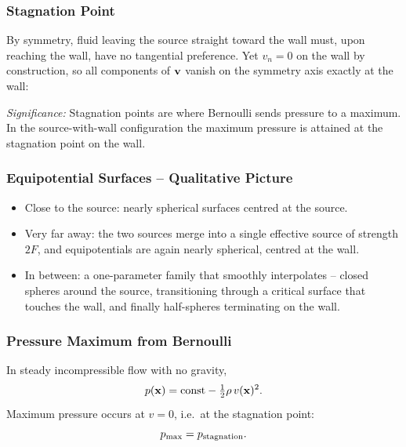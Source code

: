 \documentclass[../main.tex]{subfiles}
\begin{document}
\subsubsection{Stagnation Point}

By symmetry, fluid leaving the source straight toward the wall must, upon reaching the wall, have no tangential preference. Yet $v_n=0$ on the wall by construction, so all components of $\mathbf{v}$ vanish on the symmetry axis exactly at the wall:

\textit{Significance:} Stagnation points are where Bernoulli sends pressure to a maximum. In the source-with-wall configuration the maximum pressure is attained at the stagnation point on the wall.

\subsubsection{Equipotential Surfaces -- Qualitative Picture}

\begin{itemize}
  \item Close to the source: nearly spherical surfaces centred at the source.
  \item Very far away: the two sources merge into a single effective source of strength $2F$, and equipotentials are again nearly spherical, centred at the wall.
  \item In between: a one-parameter family that smoothly interpolates -- closed spheres around the source, transitioning through a critical surface that touches the wall, and finally half-spheres terminating on the wall.
\end{itemize}

\subsubsection{Pressure Maximum from Bernoulli}

In steady incompressible flow with no gravity,
\begin{equation}
  p(\mathbf{x}) = \mathrm{const} - \tfrac{1}{2}\rho\,v(\mathbf{x})^2.
  \label{eq:lec15_p_bern2}
\end{equation}
Maximum pressure occurs at $v=0$, i.e.\ at the stagnation point:
\begin{equation}
  p_{\max} = p_{\rm stagnation}.
  \label{eq:lec15_pmax_stag}
\end{equation}
\end{document}
